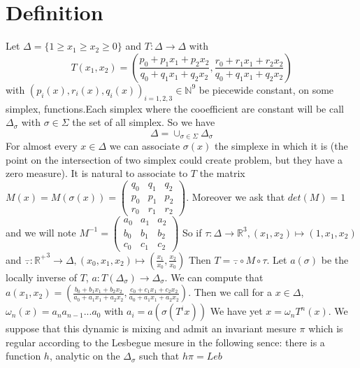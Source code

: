\documentclass[12pt]{article}
\theoremstyle{plain}%
\theoremstyle{definition}
\theoremstyle{remark}
\begin{document}
\section{Definition}%
Let $\Delta=\{ 1 \geq x_1 \geq x_2 \geq 0 \}$ and $T:\Delta \to \Delta$ with \[ T(x_1,x_2)=(\frac{p_0+p_1 x_1+p_2 x_2}{q_0+q_1 x_1 +q_2 x_2},\frac{r_0+r_1 x_1+r_2 x_2}{q_0+q_1 x_1 +q_2 x_2}) \] with $(p_i(x),r_i(x),q_i(x))_{i=1,2,3}\in \mathbb{N}^9$ be piecewide constant, on some simplex, functions.Each simplex where the cooefficient are constant will be call $\Delta_\sigma$ with $\sigma \in \Sigma$ the set of all simplex. So we have
\[
\Delta = \cup_{\sigma \in \Sigma} \Delta_\sigma
\]
For almost every $x \in \Delta$ we can associate $\sigma(x)$ the simplexe in which it is (the point on the intersection of two simplex could create problem, but they have a zero measure).
\newline It is natural to associate to $T$ the matrix $M(x)=M(\sigma(x))=\begin{pmatrix} q_0 & q_1 & q_2 \\ p_0 & p_1 & p_2 \\ r_0 & r_1 & r_2 \end{pmatrix}$. Moreover we ask that $det(M)=1$ and we will note $M^{-1}=\begin{pmatrix} a_0 & a_1 & a_2 \\ b_0 & b_1 & b_2 \\ c_0 & c_1 & c_2 \end{pmatrix}$%
\newline
So if $\tau: \Delta \to \mathbb{R}^3, (x_1,x_2) \mapsto (1,x_1,x_2)$ and $\overset{-}{.}: \mathbb{R^+}^3 \to \Delta,(x_0,x_1,x_2) \mapsto (\frac{x_1}{x_0},\frac{x_2}{x_0})$
Then $T=\overset{-}{.} \circ M \circ \tau$.\newline
Let $a(\sigma)$ be the locally inverse of $T$, $a:T(\Delta_\sigma) \to \Delta_\sigma$. We can compute that $a(x_1,x_2)=(\frac{b_0+b_1 x_1 + b_2 x_2}{a_0 + a_1 x_1 + a_2 x_2},\frac{c_0 + c_1 x_1 + c_2 x_2}{a_0 + a_1 x_1 + a_2 x_2})$. Then we call for a $x \in \Delta$, $\omega_n(x)=a_n a_{n-1} ... a_0$ with $a_i=a(\sigma(T^i x))$\newline
We have yet $x=\omega_n T^n(x)$.
\newline
\color{green}
We suppose that this dynamic is mixing and admit an invariant mesure $\pi$ which is regular according to the Lesbegue mesure in the following sence: there is a function $h$, analytic on the $\Delta_\sigma$ such that $h \pi= Leb$
\color{black}
\end{document}

